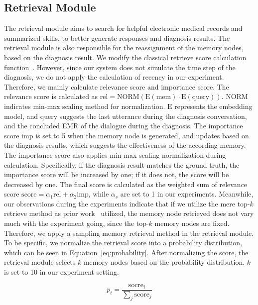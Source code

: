 \subsection{Retrieval Module}
The retrieval module aims to search for helpful electronic medical records and summarized skills, to better generate responses and diagnosis results. The retrieval module is also responsible for the reassignment of the memory nodes, based on the diagnosis result. We modify the classical retrieve score calculation function~\cite{Park2023GenerativeAgents}. However, since our system does not simulate the time step of the diagnosis, we do not apply the calculation of recency in our experiment. Therefore, we mainly calculate relevance score and importance score. The relevance score is calculated as $\mathrm{rel} = \mathrm{NORM}(\mathrm{E}(\mathrm{mem})\cdot \mathrm{E}(\mathrm{query}))$. $\mathrm{NORM}$ indicates min-max scaling method for normalization. $\mathrm{E}$ represents the embedding model, and $\mathrm{query}$ suggests the last utterance during the diagnosis conversation, and the concluded EMR of the dialogue during the diagnosis. The importance score $\mathrm{imp}$ is set to 5 when the memory node is generated, and updates based on the diagnosis results, which suggests the effectiveness of the according memory. The importance score also applies min-max scaling normalization during calculation. Specifically, if the diagnosis result matches the ground truth, the importance score will be increased by one; if it does not, the score will be decreased by one. The final score is calculated as the weighted sum of relevance score $\mathrm{score} = \alpha_1 \mathrm{rel} + \alpha_2 \mathrm{imp}$, while $\alpha_s$ are set to 1 in our experiments. Meanwhile, our observations during the experiments indicate that if we utilize the mere top-$k$ retrieve method as prior work~\cite{Park2023GenerativeAgents} utilized, the memory node retrieved does not vary much with the experiment going, since the top-$k$ memory nodes are fixed. Therefore, we apply a sampling memory retrieval method in the retrieval module. To be specific, we normalize the retrieval score into a probability distribution, which can be seen in Equation~\ref{eq:probability}. After normalizing the score, the retrieval module selects $k$ memory nodes based on the probability distribution. $k$ is set to 10 in our experiment setting. 

\begin{equation}
    p_i = \frac{\mathrm{socre}_i}{\sum_j \mathrm{score}_j}
    \label{eq:probability}
\end{equation}